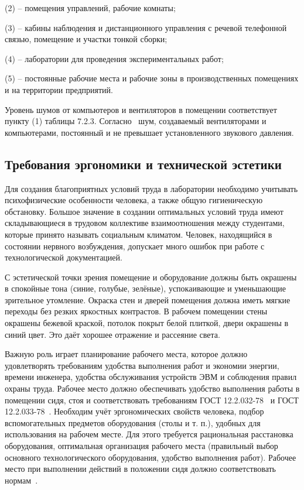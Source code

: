 (2) – помещения управлений, рабочие комнаты;

(3) – кабины наблюдения и дистанционного управления с речевой телефонной связью, помещение и участки тонкой сборки;

(4) – лаборатории для проведения экспериментальных работ;

(5) – постоянные рабочие места и рабочие зоны в производственных помещениях и на территории предприятий.

Уровень шумов от компьютеров и вентиляторов в помещении соответствует пункту (1) таблицы 7.2.3. Согласно~\cite{gost_sec_ergo_33} шум, создаваемый вентиляторами и компьютерами, постоянный и не превышает установленного звукового давления.
\subsection{Требования эргономики и технической эстетики}

Для создания благоприятных условий труда в лаборатории необходимо учитывать психофизические особенности человека, а также общую гигиеническую обстановку.
Большое значение в создании оптимальных условий труда имеют складывающиеся в трудовом коллективе взаимоотношения между студентами, которые принято называть социальным климатом.
Человек, находящийся в состоянии нервного возбуждения, допускает много ошибок при работе с технологической документацией.

С эстетической точки зрения помещение и оборудование должны быть окрашены в спокойные тона (синие, голубые, зелёные), успокаивающие и уменьшающие зрительное утомление.
Окраска стен и дверей помещения должна иметь мягкие переходы без резких яркостных контрастов. В рабочем помещении стены окрашены бежевой краской, потолок покрыт белой плиткой, двери окрашены в синий цвет. Это даёт хорошее отражение и рассеяние света.

Важную роль играет планирование рабочего места, которое должно удовлетворять требованиям удобства выполнения работ и экономии энергии, времени инженера, удобства обслуживания устройств ЭВМ и соблюдения правил охраны труда. Рабочее место должно обеспечивать удобство выполнения работы в помещении сидя, стоя и соответствовать требованиям ГОСТ 12.2.032-78~\cite{gost_sec_ergonom_32} и ГОСТ 12.2.033-78~\cite{gost_sec_ergo_33}.
Необходим учёт эргономических свойств человека, подбор вспомогательных предметов оборудования (столы и т. п.), удобных для использования на рабочем месте. Для этого требуется рациональная расстановка оборудования, оптимальная организация рабочего места (правильный выбор основного технологического оборудования, удобство выполнения работ). Рабочее место при выполнении действий в положении сидя должно соответствовать нормам~\cite{gost_sec_ergonom_32}.

